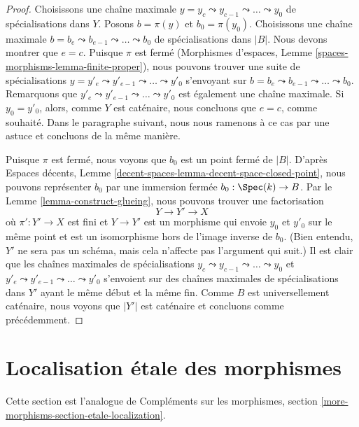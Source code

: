 \begin{proof}
\medskip\noindent
Choisissons une chaîne maximale
$y = y_c \leadsto y_{c - 1} \leadsto \ldots \leadsto y_0$
de spécialisations dans $Y$.
Posons $b = \pi(y)$ et $b_0 = \pi(y_0)$.
Choisissons une chaîne maximale
$b = b_e \leadsto b_{e - 1} \leadsto \ldots \leadsto b_0$
de spécialisations dans $|B|$.
Nous devons montrer que $e = c$.
Puisque $\pi$ est fermé
(Morphismes d'espaces, Lemme \ref{spaces-morphisms-lemma-finite-proper}),
nous pouvons trouver une suite de spécialisations
$y = y'_e \leadsto y'_{e - 1} \leadsto \ldots \leadsto y'_0$
s'envoyant sur
$b = b_e \leadsto b_{e - 1} \leadsto \ldots \leadsto b_0$.
Remarquons que $y'_e \leadsto y'_{e - 1} \leadsto \ldots \leadsto y'_0$
est également une chaîne maximale.
Si $y_0 = y'_0$, alors, comme $Y$ est caténaire, nous concluons
que $e = c$, comme souhaité. Dans le paragraphe suivant, nous nous ramenons à
ce cas par une astuce et concluons de la même manière.

\medskip\noindent
Puisque $\pi$ est fermé, nous voyons que $b_0$ est un point fermé de $|B|$.
D'après Espaces décents, Lemme \ref{decent-spaces-lemma-decent-space-closed-point},
nous pouvons représenter $b_0$ par une immersion fermée $b_0 : \Spec(k) \to B$.
Par le Lemme \ref{lemma-construct-glueing},
nous pouvons trouver une factorisation
$$
Y \to Y' \to X
$$
où $\pi' : Y' \to X$ est fini et $Y \to Y'$ est un morphisme qui
envoie $y_0$ et $y'_0$ sur le même point et est un isomorphisme
hors de l'image inverse de $b_0$.
(Bien entendu, $Y'$ ne sera pas un schéma, mais cela n'affecte pas
l'argument qui suit.)
Il est clair que les chaînes maximales de spécialisations
$y_c \leadsto y_{c - 1} \leadsto \ldots \leadsto y_0$ et
$y'_e \leadsto y'_{e - 1} \leadsto \ldots \leadsto y'_0$
s'envoient sur des chaînes maximales de spécialisations dans $Y'$
ayant le même début et la même fin.
Comme $B$ est universellement caténaire, nous voyons que
$|Y'|$ est caténaire et concluons comme précédemment.
\end{proof}






\section{Localisation étale des morphismes}
\label{section-etale-localization}

\noindent
Cette section est l'analogue de
Compléments sur les morphismes, section \ref{more-morphisms-section-etale-localization}.

